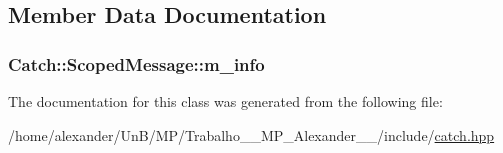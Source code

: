 \subsection{Member Data Documentation}
\hypertarget{classCatch_1_1ScopedMessage_ae6e1476f389cc6e1586f033b3747b27b}{
\subsubsection[{m\-\_\-info}]{ Catch\-::\-Scoped\-Message\-::m\-\_\-info}}\label{classCatch_1_1ScopedMessage_ae6e1476f389cc6e1586f033b3747b27b}


The documentation for this class was generated from the following file\-:\begin{DoxyCompactItemize}
\item 
/home/alexander/\-Un\-B/\-M\-P/\-Trabalho\-\_\-\_\-\-M\-P\-\_\-\-Alexander\-\_\-\_/include/\hyperlink{catch_8hpp}{catch.\-hpp}\end{DoxyCompactItemize}
